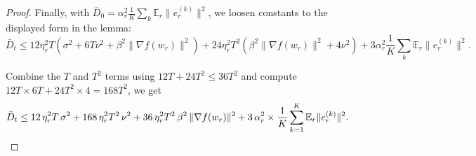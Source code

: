 \documentclass[10pt,a4paper]{amsart}
\newcommand{\E}{\mathbb{E}}
\begin{document}
\begin{proof}
Finally, with \(\bar D_0 = \alpha_r^{2} \tfrac{1}{K} \sum_k \mathbb{E}_r \|e_r^{(k)}\|^{2}\), we loosen constants to the displayed form in the lemma:
\[
\bar D_t
\le
12\eta_r^{2}T
   \left(\sigma^{2} + 6T\nu^{2} + \beta^{2}\|\nabla f(w_r)\|^{2}\right)
+ 24\eta_r^{2}T^{2}
   \left(\beta^{2}\|\nabla f(w_r)\|^{2} + 4\nu^{2}\right)
+ 3\alpha_r^{2}\frac{1}{K} \sum_k \mathbb{E}_r \|e_r^{(k)}\|^{2}.
\]

Combine the $T$ and $T^2$ terms using $12T+24T^2\le 36T^2$ and compute $12T\times 6T+24T^2\times 4=168T^2$, we get
\begin{align}
\bar D_t
&\le
12\,\eta_r^{2}T\,\sigma^{2}
+168\,\eta_r^{2}T^{2}\,\nu^{2}
+36\,\eta_r^{2}T^{2}\,\beta^{2}\,\|\nabla f(w_r)\|^{2}
+3\,\alpha_r^{2}\times \frac{1}{K}\sum_{k=1}^{K}\E_r\|e_r^{(k)}\|^{2}.  \notag
\end{align}

\end{proof}
\end{document}
